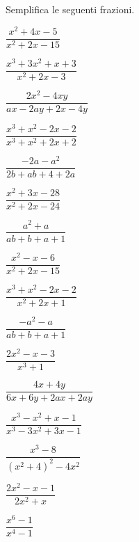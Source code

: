 \begin{esercizio}[*]
\label{ese:19.10}
Semplifica le seguenti frazioni.
\begin{htmulticols}{2}
\begin{enumeratea}
\item \(\dfrac{x^{2}+4x-5}{x^{2}+2x-15}\)
\item \(\dfrac{x^{3}+3x^{2}+x+3}{x^{2}+2x-3}\)
\item \(\dfrac{2x^{2}-4xy}{ax-2ay+2x-4y}\)
\item \(\dfrac{x^{3}+x^{2}-2x-2}{x^{3}+x^{2}+2x+2}\)
\item \(\dfrac{-2a-a^{2}}{2b+ab+4+2a}\)
\item \(\dfrac{x^{2}+3x-28}{x^{2}+2x-24}\)
\item \(\dfrac{a^{2}+a}{ab+b+a+1}\)
\item \(\dfrac{x^{2}-x-6}{x^{2}+2x-15}\)
\item \(\dfrac{x^{3}+x^{2}-2x-2}{x^{2}+2x+1}\)
\item \(\dfrac{-a^{2}-a}{ab+b+a+1}\)
\item \(\dfrac{2x^{2}-x-3}{x^{3}+1}\)
\item \(\dfrac{4x+4y}{6x\!+\!6y\!+\!2ax\!+\!2ay}\)
\item \(\dfrac{x^{3}-x^{2}+x-1}{x^{3}\!-\!3x^{2}\!+\!3x\!-\!1}\)
\item \(\dfrac{x^{3}-8}{\left(x^{2}+4\right)^{2}-4x^{2}}\)
\item \(\dfrac{2x^{2}-x-1}{2x^{2}+x}\)
\item \(\dfrac{x^{6}-1}{x^{4}-1}\)
\end{enumeratea}
\end{htmulticols}
\end{esercizio}

